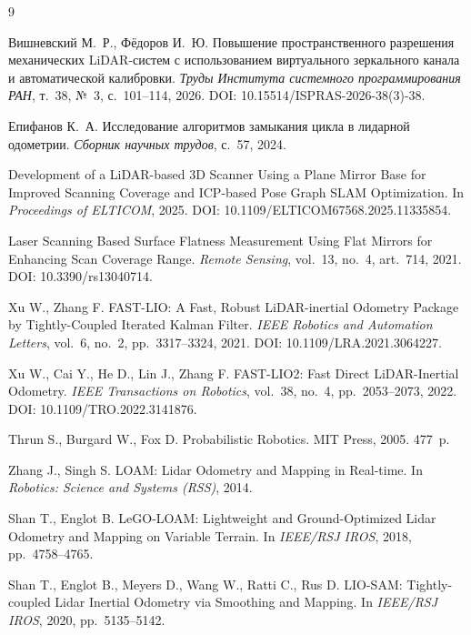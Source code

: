 \documentclass{misisarticle}
\begin{document}
\begin{thebibliography}{9}

 Вишневский М.~Р., Фёдоров И.~Ю. Повышение пространственного разрешения механических LiDAR-систем с использованием виртуального зеркального канала и автоматической калибровки. \textit{Труды Института системного программирования РАН}, т.~38, №~3, с.~101--114, 2026. DOI: 10.15514/ISPRAS-2026-38(3)-38.

 Епифанов К.~А. Исследование алгоритмов замыкания цикла в лидарной одометрии. \textit{Сборник научных трудов}, с.~57, 2024.

 Development of a LiDAR-based 3D Scanner Using a Plane Mirror Base for Improved Scanning Coverage and ICP-based Pose Graph SLAM Optimization. In \textit{Proceedings of ELTICOM}, 2025. DOI: 10.1109/ELTICOM67568.2025.11335854.

 Laser Scanning Based Surface Flatness Measurement Using Flat Mirrors for Enhancing Scan Coverage Range. \textit{Remote Sensing}, vol.~13, no.~4, art.~714, 2021. DOI: 10.3390/rs13040714.

 Xu W., Zhang F. FAST-LIO: A Fast, Robust LiDAR-inertial Odometry Package by Tightly-Coupled Iterated Kalman Filter. \textit{IEEE Robotics and Automation Letters}, vol.~6, no.~2, pp.~3317--3324, 2021. DOI: 10.1109/LRA.2021.3064227.

 Xu W., Cai Y., He D., Lin J., Zhang F. FAST-LIO2: Fast Direct LiDAR-Inertial Odometry. \textit{IEEE Transactions on Robotics}, vol.~38, no.~4, pp.~2053--2073, 2022. DOI: 10.1109/TRO.2022.3141876.

 Thrun S., Burgard W., Fox D. Probabilistic Robotics. MIT Press, 2005. 477~p.

 Zhang J., Singh S. LOAM: Lidar Odometry and Mapping in Real-time. In \textit{Robotics: Science and Systems (RSS)}, 2014.

 Shan T., Englot B. LeGO-LOAM: Lightweight and Ground-Optimized Lidar Odometry and Mapping on Variable Terrain. In \textit{IEEE/RSJ IROS}, 2018, pp.~4758--4765.

 Shan T., Englot B., Meyers D., Wang W., Ratti C., Rus D. LIO-SAM: Tightly-coupled Lidar Inertial Odometry via Smoothing and Mapping. In \textit{IEEE/RSJ IROS}, 2020, pp.~5135--5142.


\end{thebibliography}
\end{document}
